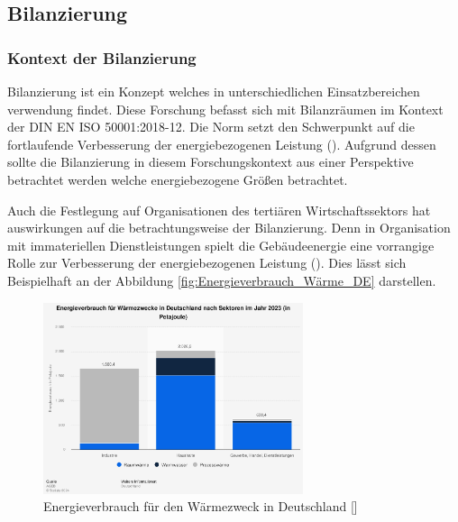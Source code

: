 \subsection{Bilanzierung}

\subsubsection{Kontext der Bilanzierung}

Bilanzierung ist ein Konzept welches in unterschiedlichen Einsatzbereichen verwendung findet. Diese Forschung befasst sich mit Bilanzräumen 
im Kontext der DIN EN ISO 50001:2018-12. Die Norm setzt den Schwerpunkt auf die fortlaufende Verbesserung der energiebezogenen Leistung 
(\cite[Kapitel 0.2]{DIN50001.2018}). Aufgrund dessen sollte die Bilanzierung in diesem Forschungskontext aus einer Perspektive betrachtet werden welche 
energiebezogene Größen betrachtet.

Auch die Festlegung auf Organisationen des tertiären Wirtschaftssektors hat auswirkungen auf die betrachtungsweise der Bilanzierung. 
Denn in Organisation mit immateriellen Dienstleistungen spielt die Gebäudeenergie eine vorrangige Rolle zur Verbesserung der energiebezogenen 
Leistung (\cite[S. 3]{Fichera.2020}). 
Dies lässt sich Beispielhaft an der Abbildung \eqref{fig:Energieverbrauch_Wärme_DE} darstellen.

\begin{figure}[H]
    \centering
    \includegraphics[width=0.68\textwidth]{../../Ressourcen/Bilder/Energieverbrauch_für_Wärmezweck_DE.jpg}
    \caption{Energieverbrauch für den Wärmezweck in Deutschland [\cite{AGEB.2024}]}
    \label{fig:Energieverbrauch_Wärme_DE}
\end{figure}

